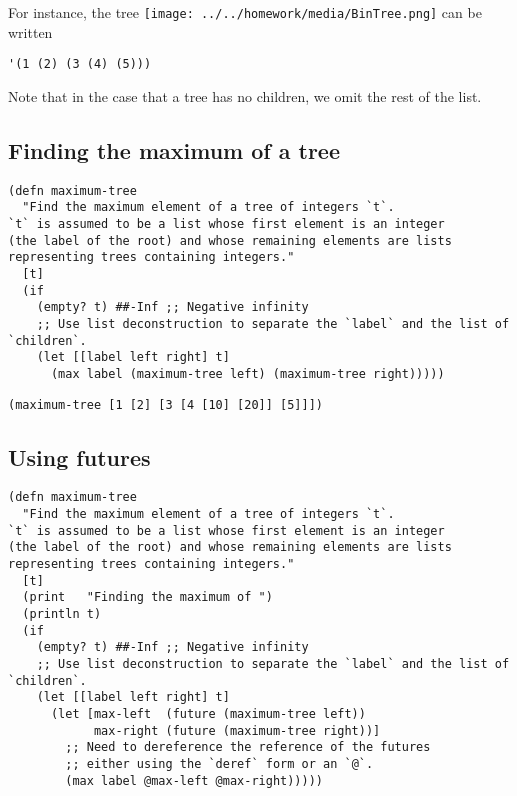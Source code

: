 \documentclass[11pt]{article}
\begin{document}
For instance, the tree
\texttt{[image: ../../homework/media/BinTree.png]}
can be written
\begin{verbatim}
'(1 (2) (3 (4) (5)))
\end{verbatim}

Note that in the case that a tree has no children,
we omit the rest of the list.

\subsection{Finding the maximum of a tree}
\label{sec:orga1e35d8}
\begin{verbatim}
(defn maximum-tree
  "Find the maximum element of a tree of integers `t`.
`t` is assumed to be a list whose first element is an integer
(the label of the root) and whose remaining elements are lists
representing trees containing integers."
  [t]
  (if
    (empty? t) ##-Inf ;; Negative infinity
    ;; Use list deconstruction to separate the `label` and the list of `children`.
    (let [[label left right] t]
      (max label (maximum-tree left) (maximum-tree right)))))
\end{verbatim}

\begin{verbatim}
(maximum-tree [1 [2] [3 [4 [10] [20]] [5]]])
\end{verbatim}

\subsection{Using futures}
\label{sec:org98a5333}
\begin{verbatim}
(defn maximum-tree
  "Find the maximum element of a tree of integers `t`.
`t` is assumed to be a list whose first element is an integer
(the label of the root) and whose remaining elements are lists
representing trees containing integers."
  [t]
  (print   "Finding the maximum of ")
  (println t)
  (if
    (empty? t) ##-Inf ;; Negative infinity
    ;; Use list deconstruction to separate the `label` and the list of `children`.
    (let [[label left right] t]
      (let [max-left  (future (maximum-tree left))
            max-right (future (maximum-tree right))]
        ;; Need to dereference the reference of the futures
        ;; either using the `deref` form or an `@`.
        (max label @max-left @max-right)))))
\end{verbatim}
\end{document}
